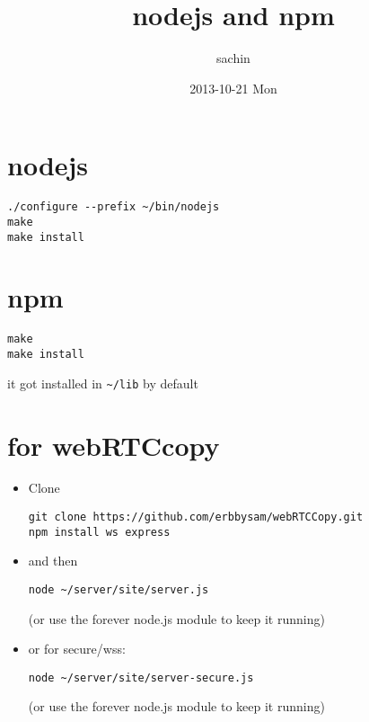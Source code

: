 \documentclass[11pt]{article}
\title{nodejs and npm}
\author{sachin}
\date{2013-10-21 Mon}
\begin{document}
\maketitle

\setcounter{tocdepth}{3}
\tableofcontents
\vspace*{1cm}

\section{nodejs}
\label{sec-1}

   

\begin{verbatim}
./configure --prefix ~/bin/nodejs
make 
make install
\end{verbatim}

   
\section{npm}
\label{sec-2}

   

\begin{verbatim}
make 
make install
\end{verbatim}

   it got installed in \texttt{\textasciitilde{}/lib} by default
\section{for webRTCcopy}
\label{sec-3}

\begin{itemize}
\item Clone

\begin{verbatim}
git clone https://github.com/erbbysam/webRTCCopy.git
npm install ws express
\end{verbatim}
\item and then


\begin{verbatim}
node ~/server/site/server.js
\end{verbatim}

     (or use the forever node.js module to keep it running)
\end{itemize}


\begin{itemize}
\item or for secure/wss: 
       

\begin{verbatim}
node ~/server/site/server-secure.js
\end{verbatim}

     (or use the forever node.js module to keep it running)
\end{itemize}

   
\end{document}
